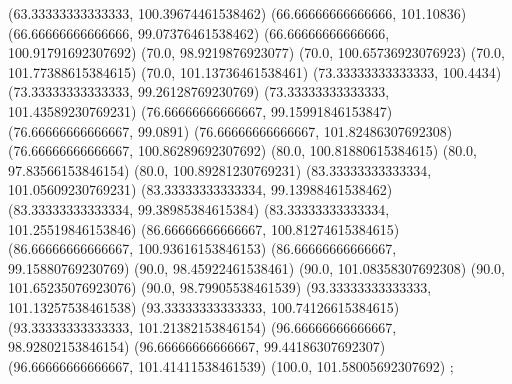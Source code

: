 {{{		(63.33333333333333, 100.39674461538462)
		(66.66666666666666, 101.10836)
		(66.66666666666666, 99.07376461538462)
		(66.66666666666666, 100.91791692307692)
		(70.0, 98.9219876923077)
		(70.0, 100.65736923076923)
		(70.0, 101.77388615384615)
		(70.0, 101.13736461538461)
		(73.33333333333333, 100.4434)
		(73.33333333333333, 99.26128769230769)
		(73.33333333333333, 101.43589230769231)
		(76.66666666666667, 99.15991846153847)
		(76.66666666666667, 99.0891)
		(76.66666666666667, 101.82486307692308)
		(76.66666666666667, 100.86289692307692)
		(80.0, 100.81880615384615)
		(80.0, 97.83566153846154)
		(80.0, 100.89281230769231)
		(83.33333333333334, 101.05609230769231)
		(83.33333333333334, 99.13988461538462)
		(83.33333333333334, 99.38985384615384)
		(83.33333333333334, 101.25519846153846)
		(86.66666666666667, 100.81274615384615)
		(86.66666666666667, 100.93616153846153)
		(86.66666666666667, 99.15880769230769)
		(90.0, 98.45922461538461)
		(90.0, 101.08358307692308)
		(90.0, 101.65235076923076)
		(90.0, 98.79905538461539)
		(93.33333333333333, 101.13257538461538)
		(93.33333333333333, 100.74126615384615)
		(93.33333333333333, 101.21382153846154)
		(96.66666666666667, 98.92802153846154)
		(96.66666666666667, 99.44186307692307)
		(96.66666666666667, 101.41411538461539)
		(100.0, 101.58005692307692)
	};

}}
